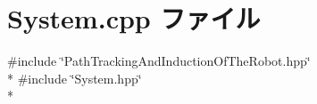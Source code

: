 \section{System.\-cpp ファイル}
\label{_system_8cpp}
{\ttfamily \#include \char`\"{}Path\-Tracking\-And\-Induction\-Of\-The\-Robot.\-hpp\char`\"{}}\\*
{\ttfamily \#include \char`\"{}System.\-hpp\char`\"{}}\\*
